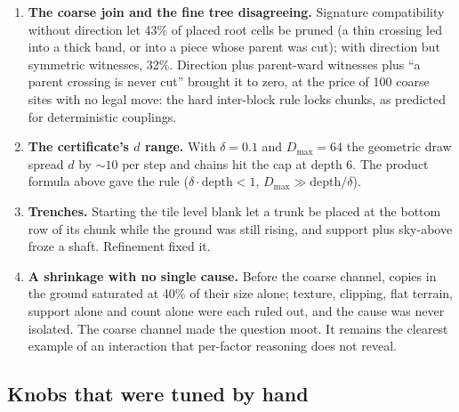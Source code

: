 \documentclass[11pt]{article}
\newcommand{\1}{\mathds{1}}
\begin{document}
\begin{enumerate}
  edge signatures rather than content similarity.
\item \textbf{The coarse join and the fine tree disagreeing.} Signature
  compatibility without direction let 43\% of placed root cells be pruned
  (a thin crossing led into a thick band, or into a piece whose parent was
  cut); with direction but symmetric witnesses, 32\%. Direction plus
  parent-ward witnesses plus ``a parent crossing is never cut'' brought it
  to zero, at the price of 100 coarse sites with no legal move: the hard
  inter-block rule locks chunks, as predicted for deterministic couplings.
\item \textbf{The certificate's $d$ range.} With $\delta = 0.1$ and
  $D_{\max} = 64$ the geometric draw spread $d$ by $\sim 10$ per step and
  chains hit the cap at depth 6. The product formula above gave the rule
  ($\delta \cdot \text{depth} < 1$, $D_{\max} \gg \text{depth}/\delta$).
\item \textbf{Trenches.} Starting the tile level blank let a trunk be
  placed at the bottom row of its chunk while the ground was still rising,
  and support plus sky-above froze a shaft. Refinement fixed it.
\item \textbf{A shrinkage with no single cause.} Before the coarse channel,
  copies in the ground saturated at 40\% of their size alone; texture,
  clipping, flat terrain, support alone and count alone were each ruled
  out, and the cause was never isolated. The coarse channel made the
  question moot. It remains the clearest example of an interaction that
  per-factor reasoning does not reveal.
\end{enumerate}

\subsection{Knobs that were tuned by hand}
\end{document}

